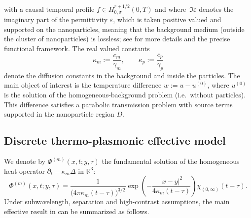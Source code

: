 \documentclass[11pt,a4paper]{article}
\numberwithin{equation}{section}
\theoremstyle{definition}
\newcommand{\R}{\mathbb{R}}
\newcommand{\eps}{\varepsilon}
\newcommand{\1}{\mathbbm{1}}
\newcommand{\kappam}{\kappa_m}
\begin{document}
with a causal temporal profile $f\in H^{r+1/2}_{0,\sigma}(0,T)$ and where~$\Im \eps$ denotes the imaginary part of the permittivity $\eps$, which is taken positive valued and supported on the nanoparticles, meaning that the background medium (outside the cluster of nanoparticles) is lossless; see
\cite{CaoMukherjeeSini2025} for more details and the precise functional framework. The real valued 
constants
\[
\kappam := \frac{c_m}{\gamma_m},\qquad \kappa_p := \frac{c_p}{\gamma_p}
\]
denote the diffusion constants in the background and inside the particles.
\newline
The main object of interest is the temperature difference
$w:=u-u^{(0)}$, where $u^{(0)}$ is the solution of the homogeneous-background
problem (i.e.\ without particles). This difference satisfies a parabolic
transmission problem with source terms supported in the nanoparticle region
$D$.

\subsection{Discrete thermo-plasmonic effective model}
\noindent
We denote by $\Phi^{(m)}(x,t;y,\tau)$ the fundamental solution of the
homogeneous heat operator $\partial_t-\kappam\Delta$ in $\R^3$:
\begin{equation}
\label{eq:heat-kernel}
\Phi^{(m)}(x,t;y,\tau)
= \frac{1}{\big(4\pi\kappam(t-\tau)\big)^{3/2}}
\exp\left(-\frac{|x-y|^2}{4\kappam(t-\tau)}\right)
\chi_{(0,\infty)}(t-\tau).
\end{equation}
\noindent
Under subwavelength, separation and high-contrast assumptions, the main
effective result in \cite{CaoMukherjeeSini2025} can be summarized as follows.
\end{document}
